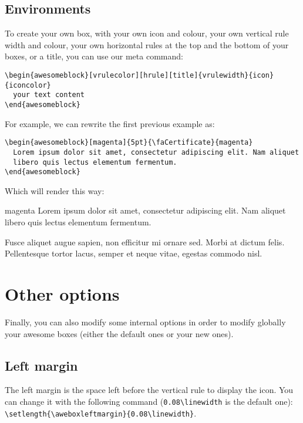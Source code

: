\documentclass[a4paper,12pt]{article}
\begin{document}
\subsection{Environments}

To create your own box, with your own icon and colour, your own
vertical rule width and colour, your own horizontal rules at the top
and the bottom of your boxes, or a title, you can use our meta
command:

\begin{verbatim}
\begin{awesomeblock}[vrulecolor][hrule][title]{vrulewidth}{icon}{iconcolor}
  your text content
\end{awesomeblock}
\end{verbatim}

For example, we can rewrite the first previous example as:

\begin{verbatim}
\begin{awesomeblock}[magenta]{5pt}{\faCertificate}{magenta}
  Lorem ipsum dolor sit amet, consectetur adipiscing elit. Nam aliquet
  libero quis lectus elementum fermentum.
\end{awesomeblock}
\end{verbatim}

Which will render this way:

\begin{awesomeblock}[magenta]{5pt}{\faCertificate}{magenta}
  Lorem ipsum dolor sit amet, consectetur adipiscing elit. Nam aliquet
  libero quis lectus elementum fermentum.

  Fusce aliquet augue sapien, non efficitur mi ornare sed. Morbi at
  dictum felis. Pellentesque tortor lacus, semper et neque vitae,
  egestas commodo nisl.
\end{awesomeblock}


\section{Other options}

Finally, you can also modify some internal options in order to modify
globally your awesome boxes (either the default ones or your new ones).

\subsection{Left margin}

The left margin is the space left before the vertical rule to display
the icon. You can change it with the following command
(\verb!0.08\linewidth! is the default one):\\
\verb!\setlength{\aweboxleftmargin}{0.08\linewidth}!.
\end{document}
